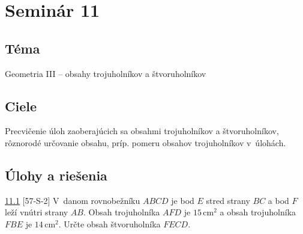 \section*{Seminár 11}
\subsection*{Téma}
Geometria III -- obsahy trojuholníkov a štvoruholníkov

\subsection*{Ciele}
Precvičenie úloh zaoberajúcich sa obsahmi trojuholníkov a štvoruholníkov,  rôznorodé určovanie obsahu, príp. pomeru obsahov trojuholníkov v~úlohách.

\subsection*{Úlohy a riešenia}
\begin{tcolorbox}[breakable,notitle,boxrule=0pt,colback=light-gray,colframe=light-gray]\ul{11.1} [57-S-2] V~danom rovnobežníku $ABCD$ je bod $E$ stred strany $BC$ a bod $F$ leží vnútri strany $AB$. Obsah trojuholníka $AFD$ je $15$\,cm$^2$ a obsah trojuholníka $FBE$ je $14$\,cm$^2$. Určte obsah štvoruholníka $FECD$.

\end{tcolorbox}

